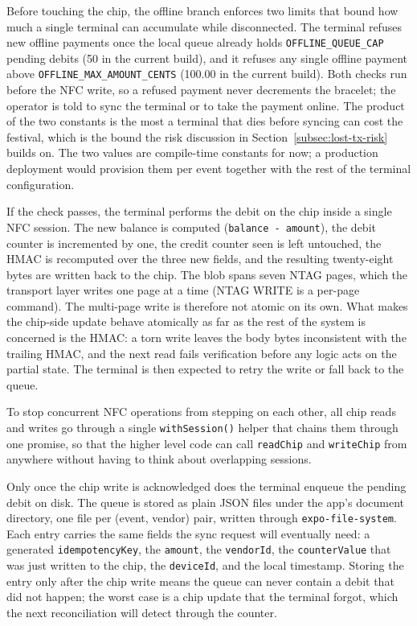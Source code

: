 Before touching the chip, the offline branch enforces two limits that bound how much a single terminal can accumulate while disconnected. The terminal refuses new offline payments once the local queue already holds \texttt{OFFLINE\_QUEUE\_CAP} pending debits (50 in the current build), and it refuses any single offline payment above \texttt{OFFLINE\_MAX\_AMOUNT\_CENTS} (100.00 in the current build). Both checks run before the NFC write, so a refused payment never decrements the bracelet; the operator is told to sync the terminal or to take the payment online. The product of the two constants is the most a terminal that dies before syncing can cost the festival, which is the bound the risk discussion in Section~\ref{subsec:lost-tx-risk} builds on. The two values are compile-time constants for now; a production deployment would provision them per event together with the rest of the terminal configuration.

If the check passes, the terminal performs the debit on the chip inside a single NFC session. The new balance is computed (\texttt{balance - amount}), the debit counter is incremented by one, the credit counter seen is left untouched, the HMAC is recomputed over the three new fields, and the resulting twenty-eight bytes are written back to the chip. The blob spans seven NTAG pages, which the transport layer writes one page at a time (NTAG WRITE is a per-page command). The multi-page write is therefore not atomic on its own. What makes the chip-side update behave atomically as far as the rest of the system is concerned is the HMAC: a torn write leaves the body bytes inconsistent with the trailing HMAC, and the next read fails verification before any logic acts on the partial state. The terminal is then expected to retry the write or fall back to the queue.

To stop concurrent NFC operations from stepping on each other, all chip reads and writes go through a single \texttt{withSession()} helper that chains them through one promise, so that the higher level code can call \texttt{readChip} and \texttt{writeChip} from anywhere without having to think about overlapping sessions.

Only once the chip write is acknowledged does the terminal enqueue the pending debit on disk. The queue is stored as plain JSON files under the app's document directory, one file per (event, vendor) pair, written through \texttt{expo-file-system}. Each entry carries the same fields the sync request will eventually need: a generated \texttt{idempotencyKey}, the \texttt{amount}, the \texttt{vendorId}, the \texttt{counterValue} that was just written to the chip, the \texttt{deviceId}, and the local timestamp. Storing the entry only after the chip write means the queue can never contain a debit that did not happen; the worst case is a chip update that the terminal forgot, which the next reconciliation will detect through the counter.

